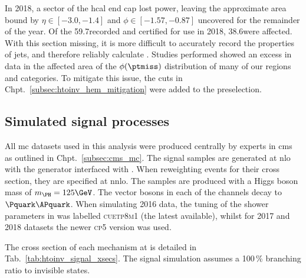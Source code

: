 In 2018, a sector of the \acrshort{hcal} end cap lost power, leaving the approximate area bound by $\eta \in [-\text{3.0}, -\text{1.4}]$ and $\phi \in [-\text{1.57}, -\text{0.87}]$ uncovered for the remainder of the year. Of the 59.7\fbinv recorded and certified for use in 2018, 38.6\fbinv were affected. With this section missing, it is more difficult to accurately record the properties of \glspl{jet}, and therefore reliably calculate \ptmiss. Studies performed showed an excess in data in the affected area of the $\phi(\ptmiss)$ distribution of many of our regions and categories. To mitigate this issue, the cuts in Chpt.~\ref{subsec:htoinv_hem_mitigation} were added to the preselection.




\subsection{Simulated signal processes}
\label{subsec:htoinv_signal}

All \acrlong{mc} datasets used in this analysis were produced centrally by experts in \acrshort{cms} as outlined in Chpt.~\ref{subsec:cms_mc}. The signal samples are generated at \acrshort{nlo} with the \POWHEG generator interfaced with \PYTHIAEIGHT. When reweighting events for their cross section, they are specified at \acrshort{nnlo}. The samples are produced with a Higgs boson mass of $m_{\PH} = \text{125}\GeV$. The vector bosons in each of the \VH channels decay to $\Pquark\APquark$. When simulating 2016 data, the tuning of the shower parameters in \PYTHIA was labelled \textsc{cuetp8m1} (the latest available), whilst for 2017 and 2018 datasets the newer \textsc{cp5} version was used.

The cross section of each mechanism at \comruntwo is detailed in Tab.~\ref{tab:htoinv_signal_xsecs}. The signal simulation assumes a 100\,\% branching ratio to invisible states.

